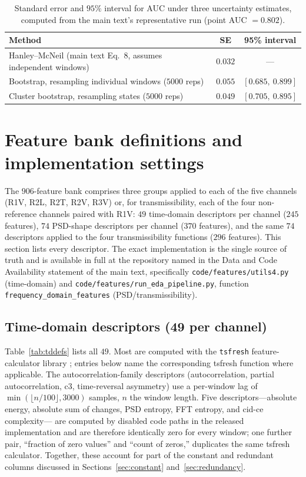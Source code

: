 \documentclass[11pt,a4paper]{article}
\begin{document}
\begin{table}[htbp]
\centering
\caption{Standard error and $95\%$ interval for AUC under three uncertainty
estimates, computed from the main text's representative run (point
AUC $=0.802$).}
\label{tab:bootstrap}
\small
\begin{tabular}{@{}lcc@{}}
\toprule
\textbf{Method} & \textbf{SE} & \textbf{95\% interval} \\
\midrule
Hanley--McNeil (main text Eq.~8, assumes independent windows) & $0.032$ & --- \\
Bootstrap, resampling individual windows ($5000$ reps)         & $0.055$ & $[0.685,\ 0.899]$ \\
Cluster bootstrap, resampling states ($5000$ reps)              & $0.049$ & $[0.705,\ 0.895]$ \\
\bottomrule
\end{tabular}
\end{table}

\section{Feature bank definitions and implementation settings}
\label{sec:featuredefs}

The $906$-feature bank comprises three groups applied to each of the five
channels (R1V, R2L, R2T, R2V, R3V) or, for transmissibility, each of the
four non-reference channels paired with R1V: $49$ time-domain descriptors
per channel ($245$ features), $74$ PSD-shape descriptors per channel
($370$ features), and the same $74$ descriptors applied to the four
transmissibility functions ($296$ features). This section lists every
descriptor. The exact implementation is the single source of truth and is
available in full at the repository named in the Data and Code Availability
statement of the main text, specifically \texttt{code/features/utils4.py}
(time-domain) and \texttt{code/features/run\_eda\_pipeline.py}, function
\texttt{frequency\_domain\_features} (PSD/transmissibility).

\subsection{Time-domain descriptors (49 per channel)}

Table~\ref{tab:tddefs} lists all $49$. Most are computed with the
\texttt{tsfresh} feature-calculator library \cite{christ2018}; entries
below name the corresponding tsfresh function where applicable. The autocorrelation-family
descriptors (autocorrelation, partial autocorrelation, c3, time-reversal
asymmetry) use a per-window lag of $\min(\lfloor n/100\rfloor, 3000)$
samples, $n$ the window length. Five descriptors---absolute energy,
absolute sum of changes, PSD entropy, FFT entropy, and cid-ce complexity---
are computed by disabled code paths in the released implementation and are
therefore identically zero for every window; one further pair, ``fraction of
zero values'' and ``count of zeros,'' duplicates the same tsfresh
calculator. Together, these account for part of the constant and redundant
columns discussed in Sections~\ref{sec:constant} and~\ref{sec:redundancy}.
\end{document}
